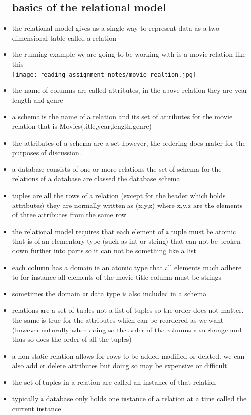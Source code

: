\documentclass{article}
\begin{document}
\begin{itemize}
\subsection{basics of the relational model}
\item the relational model gives us a single way to represent data as a two dimensional table called a relation
\item the running example we are going to be working with is a movie relation like this \\\texttt{[image: reading assignment notes/movie\_realtion.jpg]}
\item the name of columns are called attributes, in the above relation they are year length and genre
\item a schema is the name of a relation and its set of attributes for the movie relation that is Movies(title,year,length,genre)
\item the attributes of a schema are a set however, the ordering does mater for the purposes of discussion. 
\item a database consists of one or more relations the set of schema for the relations of a database are classed the database schema. 
\item tuples are all the rows of a relation (except for the header which holds attributes) they are normally written as (x,y,z) where x,y,z are the elements of three attributes from the same row
\item the relational model requires that each element of a tuple must be atomic that is of an elementary type (such as int or string) that can not be broken down further into parts so it can not be something like a list
\item each column has a domain ie an atomic type that all elements much adhere to for instance all elements of the movie title column must be strings 
\item sometimes the domain or data type is also included in a schema
\item relations are a set of tuples not a list of tuples so the order does not matter. the same is true for the attributes which can be reordered as we want (however naturally when doing so the order of the columns also change and thus so does the order of all the tuples)
\item a non static relation allows for rows to be added modified or deleted. we can also add or delete attributes but doing so may be expensive or difficult
\item the set of tuples in a relation are called an instance of that relation 
\item typically a database only holds one instance of a relation at a time called the current instance 

\end{itemize}
\end{document}
